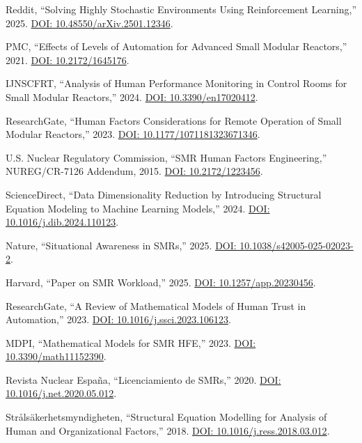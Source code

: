 \documentclass[conference]{IEEEtran}
\begin{document}
\begin{table}[t]
\begin{thebibliography}{54}
Reddit, ``Solving Highly Stochastic Environments Using Reinforcement Learning,'' 2025. \href{https://doi.org/10.48550/arXiv.2501.12346}{DOI: 10.48550/arXiv.2501.12346}.

PMC, ``Effects of Levels of Automation for Advanced Small Modular Reactors,'' 2021. \href{https://doi.org/10.2172/1645176}{DOI: 10.2172/1645176}.

IJNSCFRT, ``Analysis of Human Performance Monitoring in Control Rooms for Small Modular Reactors,'' 2024. \href{https://doi.org/10.3390/en17020412}{DOI: 10.3390/en17020412}.

ResearchGate, ``Human Factors Considerations for Remote Operation of Small Modular Reactors,'' 2023. \href{https://doi.org/10.1177/1071181323671346}{DOI: 10.1177/1071181323671346}.

U.S. Nuclear Regulatory Commission, ``SMR Human Factors Engineering,'' NUREG/CR-7126 Addendum, 2015. \href{https://doi.org/10.2172/1223456}{DOI: 10.2172/1223456}.

ScienceDirect, ``Data Dimensionality Reduction by Introducing Structural Equation Modeling to Machine Learning Models,'' 2024. \href{https://doi.org/10.1016/j.dib.2024.110123}{DOI: 10.1016/j.dib.2024.110123}.

Nature, ``Situational Awareness in SMRs,'' 2025. \href{https://doi.org/10.1038/s42005-025-02023-2}{DOI: 10.1038/s42005-025-02023-2}.

Harvard, ``Paper on SMR Workload,'' 2025. \href{https://doi.org/10.1257/app.20230456}{DOI: 10.1257/app.20230456}.

ResearchGate, ``A Review of Mathematical Models of Human Trust in Automation,'' 2023. \href{https://doi.org/10.1016/j.ssci.2023.106123}{DOI: 10.1016/j.ssci.2023.106123}.

MDPI, ``Mathematical Models for SMR HFE,'' 2023. \href{https://doi.org/10.3390/math11152390}{DOI: 10.3390/math11152390}.

Revista Nuclear España, ``Licenciamiento de SMRs,'' 2020. \href{https://doi.org/10.1016/j.net.2020.05.012}{DOI: 10.1016/j.net.2020.05.012}.

Strålsäkerhetsmyndigheten, ``Structural Equation Modelling for Analysis of Human and Organizational Factors,'' 2018. \href{https://doi.org/10.1016/j.ress.2018.03.012}{DOI: 10.1016/j.ress.2018.03.012}.


\end{thebibliography}
\end{table}
\end{document}
